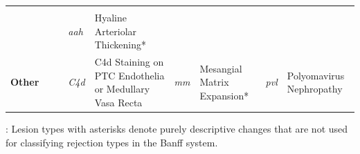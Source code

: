 \begin{landscape}
\begin{longtable}{
        p{1.00in} 
        p{0.30in} p{1.05in} 
        p{0.30in} p{1.20in} 
        p{0.30in} p{1.20in} 
        p{0.30in} p{1.05in}}
            & 
            & 
            & 
            \\
            & 
            & 
            & 
        \textit{aah} & 
        Hyaline Arteriolar Thickening* & 
            & 
            & 
            & 
            \\
        \hline
        \textbf{Other} & 
            & 
            & 
        \textit{C4d} & 
        C4d Staining on PTC Endothelia or Medullary Vasa Recta & 
        \textit{mm} & 
        Mesangial \mbox{Matrix} Expansion* & 
        \textit{pvl} & 
        Polyomavirus Nephropathy \\
        \bottomrule
    \end{longtable}
    \par\vspace{0.5em}
    \noindent*: Lesion types with asterisks denote purely descriptive changes that are not used for classifying rejection types in the Banff system.
\end{landscape}
